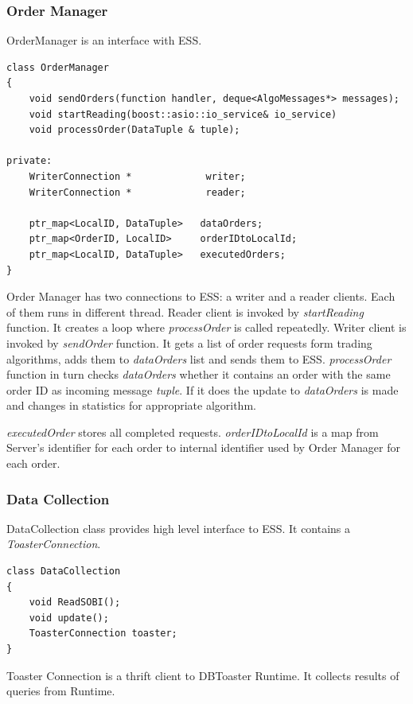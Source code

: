\documentclass[14pt]{article}
\begin{document}
\subsubsection{Order Manager}
OrderManager is an interface with ESS. 

\begin{Verbatim}
class OrderManager
{
    void sendOrders(function handler, deque<AlgoMessages*> messages);
    void startReading(boost::asio::io_service& io_service)
    void processOrder(DataTuple & tuple);
    
private:
    WriterConnection *             writer;
    WriterConnection *             reader;

    ptr_map<LocalID, DataTuple>   dataOrders;
    ptr_map<OrderID, LocalID>     orderIDtoLocalId;
    ptr_map<LocalID, DataTuple>   executedOrders;
}
\end{Verbatim}

Order Manager has two connections to ESS: a writer and a reader clients. Each of
them runs in different thread. Reader client is invoked by \emph{startReading}
function. It creates a loop where \emph{processOrder} is called
repeatedly. Writer client is invoked by \emph{sendOrder} function. It gets a
list of order requests form trading algorithms, adds them to \emph{dataOrders}
list and sends them to ESS. \emph{processOrder} function in turn checks
\emph{dataOrders} whether it contains an order with the same order ID as
incoming message \emph{tuple}. If it does the update to \emph{dataOrders} is
made and changes in statistics for appropriate algorithm.

\emph{executedOrder} stores all completed requests. \emph{orderIDtoLocalId} is a
map from Server's identifier for each order to internal identifier used by Order
Manager for each order.


\subsubsection{Data Collection}
DataCollection class provides high level interface to ESS. It contains a
\emph{ToasterConnection}.

\begin{Verbatim}
class DataCollection
{
    void ReadSOBI();
    void update();
    ToasterConnection toaster;
}
\end{Verbatim}

Toaster Connection is a thrift client to DBToaster Runtime. It collects results
of queries from Runtime.
\end{document}
